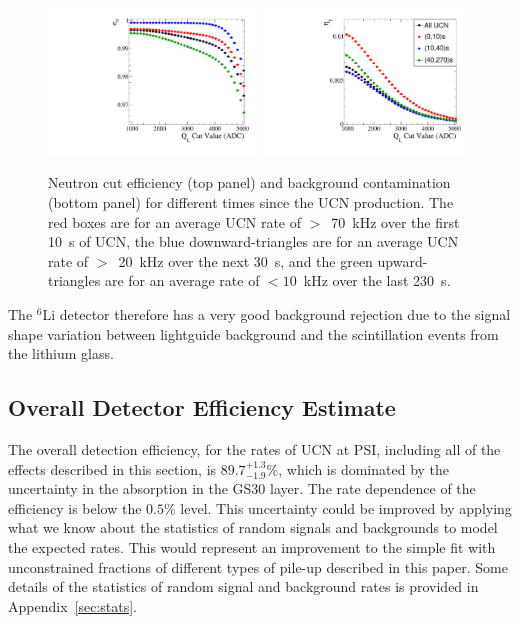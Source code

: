 \documentclass[letter,twocolumn,preprint,3p,numbers,sort&compress]{elsarticle}
\begin{document}
\begin{figure}[!htpb]
\centering \includegraphics[width = 0.49\textwidth, angle=0]{figures/neutronEffLayered.pdf}
\centering \includegraphics[width = 0.49\textwidth, angle=0]{figures/backgroundContLayered.pdf}
\caption{ Neutron cut efficiency (top panel) and background
  contamination (bottom panel) for different times since the UCN
  production.  The red boxes are for an average UCN rate of $>$~70~kHz
  over the first 10~s of UCN, the blue downward-triangles are for an
  average UCN rate of $>$~20~kHz over the next 30~s, and the green
  upward-triangles are for an average rate of $<10$~kHz over the last
  230~s.}
\label{fig:detectionEffLayered}
\end{figure}

The $^6$Li detector therefore has a very good background rejection due
to the signal shape variation between lightguide background and the
scintillation events from the lithium glass.  

\subsection{Overall Detector Efficiency Estimate}

The overall detection efficiency, for the rates of UCN at PSI,
including all of the effects described in this section, is
$89.7^{+1.3}_{-1.9}$\%, which is dominated by the uncertainty in the
absorption in the GS30 layer. The rate dependence of the efficiency is
below the $0.5$\% level.  This uncertainty could be improved by
applying what we know about the statistics of random signals and
backgrounds to model the expected rates.  This would represent an
improvement to the simple fit with unconstrained fractions of
different types of pile-up described in this paper.  Some details of
the statistics of random signal and background rates is provided in
Appendix~\ref{sec:stats}.
\end{document}
